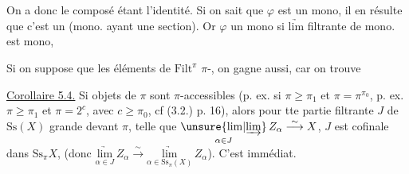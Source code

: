 
On a donc
le composé étant l'identité. Si on sait
que $\varphi$ est un mono, il en résulte
que c'est un  (mono. ayant
une section).  Or $\varphi$  un
mono si  $\underrightarrow{\mathrm{lim}}$\unsure{;|:} filtrante de
mono. est mono, 

Si on suppose  que les
éléments de $\mathrm{Filt}^{\pi}$  $\pi$-,
on gagne aussi, car on trouve

\uline{Corollaire 5.4.} Si  objets de $\pi$
sont $\pi$-accessibles (p. ex. si $\pi\geq\pi_1$ et $\pi=\pi^{\pi_0}$,
p. ex. $\pi\geq\pi_1$ et $\pi=2^c$, avec $c\geq\pi_0$, cf
(3.2.) p. 16), alors pour tte partie filtrante
$J$ de $\mathrm{Ss}(X)$ grande devant $\pi$, telle que
$\underset{\alpha\in J}{\unsure{\mathrm{lim}|\underrightarrow{\mathrm{lim}}}}\,Z_\alpha\overset{\sim}{\longrightarrow}X$,
$J$ est cofinale dans $\mathrm{Ss}_{\pi}X$,
(donc $\underset{\alpha\in J}{\underrightarrow{\mathrm{lim}}}\,Z_\alpha\overset{\sim}{\longrightarrow}
\underset{\alpha\in\mathrm{Ss}_{\pi}(X)}{\underrightarrow{\mathrm{lim}}}\,Z_\alpha$)\deleted{\unsure{)}}.
 C'est immédiat.

